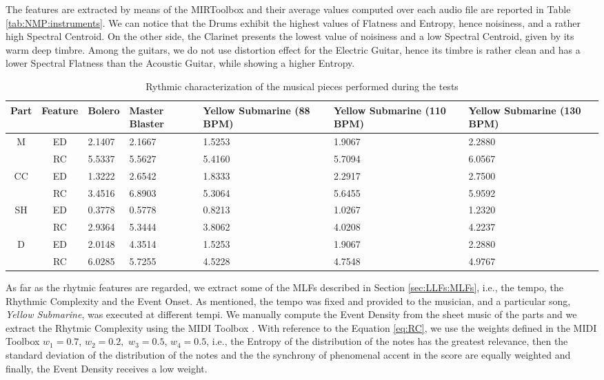 The features are extracted by means of the MIRToolbox \cite{Lartillot2007} and their average values computed over each audio file are reported in Table \ref{tab:NMP:instruments}. We can notice that the Drums exhibit the highest values of Flatness and Entropy, hence noisiness, and a rather high Spectral Centroid. On the other side, the Clarinet presents the lowest value of noisiness and a low Spectral Centroid, given by its warm deep timbre. Among the guitars, we do not use distortion effect for the Electric Guitar, hence its timbre is rather clean and has a lower Spectral Flatness than the Acoustic Guitar, while showing a higher Entropy.

\begin{table}[tb]
  \caption{Rythmic characterization of the musical pieces performed during the tests}
  \centering %
  \label{tab:NMP:pieces}  
  \bgroup
  \def\arraystretch{1.5}
 \begin{tabular}{||c|c|p{1.4cm}|p{1.4cm}|p{1.8cm}|p{1.8cm}|p{1.8cm}||}
 \hline
 \hline
Part &  Feature & Bolero & Master Blaster & Yellow Submarine (88 BPM) & Yellow Submarine (110 BPM) & Yellow Submarine (130 BPM)\\
 \hline
 \hline
 \multirow{2}{*}{M}& ED & 2.1407 & 2.1667 & 1.5253 & 1.9067 & 2.2880 \\
           & RC & 5.5337 & 5.5627 & 5.4160 & 5.7094 & 6.0567 \\
\hline
\multirow{2}{*}{CC}& ED & 1.3222 & 2.6542 & 1.8333 & 2.2917 & 2.7500 \\
          & RC & 3.4516 & 6.8903 & 5.3064 & 5.6455 & 5.9592\\
\hline
\multirow{2}{*}{SH}& ED & 0.3778 & 0.5778 & 0.8213 & 1.0267 & 1.2320 \\
          & RC & 2.9364 & 5.3444 & 3.8062 & 4.0208 & 4.2237\\
\hline
\multirow{2}{*}{D}& ED & 2.0148 & 4.3514 & 1.5253 & 1.9067 & 2.2880 \\
         & RC & 6.0285 & 5.7255 & 4.5228 & 4.7548 &  4.9767 \\
 \hline
 \hline
   \end{tabular}
   \egroup
\end{table}

As far as the rhytmic features are regarded, we extract some of the MLFs described in Section \ref{sec:LLFs:MLFs}, i.e., the tempo, the Rhythmic Complexity and the Event Onset. As mentioned, the tempo was fixed and provided to the musician, and a particular song, \textit{Yellow Submarine}, was executed at different tempi. We manually compute the Event Density \cite{Lartillot2007} from the sheet music of the parts and we extract the Rhytmic Complexity \cite{povel} using the MIDI Toolbox \cite{Eerola2004}. With reference to the Equation \ref{eq:RC}, we use the weights defined in the MIDI Toolbox $w_1= 0.7$, $w_2=0.2,$  $w_3=0.5$, $w_4=0.5$, i.e., the Entropy of the distribution of the notes has the greatest relevance, then the standard deviation of the distribution of the notes and the the synchrony of phenomenal accent in the score are equally weighted and finally, the Event Density receives a low weight. 


